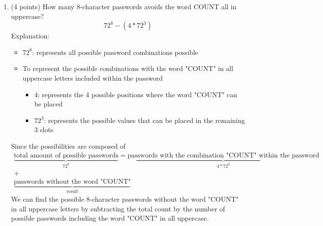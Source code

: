 \documentclass[10pt,letterpaper,unboxed,cm]{article}
\begin{document}
\begin{enumerate}
\begin{enumerate}
\begin{enumerate}
\item
(4 points)
How many 8-character passwords avoids the word COUNT all in uppercase?
$$
72^8-(4*72^3)
$$
Explanation:
\begin{itemize}
    \item $72^8$: represents all possible password combinations possible
    \item To represent the possible combinations with the word "COUNT" in all uppercase letters included within the password
    \begin{itemize}
        \item $4$: represents the 4 possible positions where the word "COUNT" can be placed
        \item $72^3$: represents the possible values that can be placed in the remaining 3 slots
    \end{itemize}
\end{itemize}
Since the possibilities are composed of 
\begin{align*}
    \underbrace{\text{total amount of possible passwords}}_{72^8} = \underbrace{\text{passwords with the combination "COUNT" within the password}}_{4*72^3}\\ 
    + \\
    \underbrace{\text{passwords without the word "COUNT"}}_{\text{result}}
\end{align*}
We can find the possible 8-character passwords without the word "COUNT" in all uppercase letters by subtracting the total count by the number of possible passwords including the word "COUNT" in all uppercase.


\end{enumerate}
\end{enumerate}
\end{enumerate}
\end{document}
